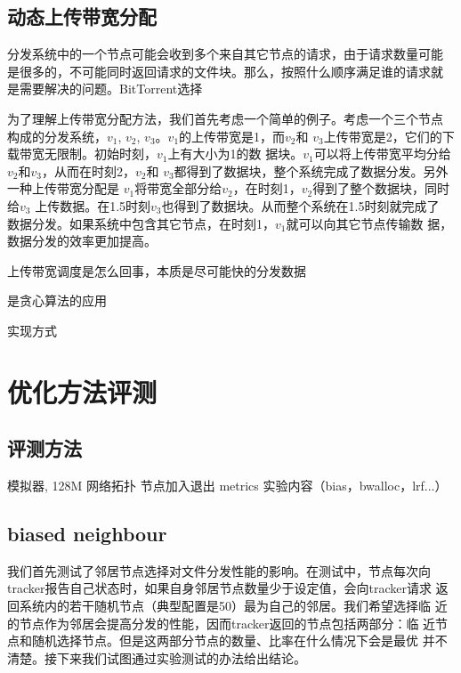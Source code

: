 \subsection{动态上传带宽分配}

分发系统中的一个节点可能会收到多个来自其它节点的请求，由于请求数量可能
是很多的，不可能同时返回请求的文件块。那么，按照什么顺序满足谁的请求就
是需要解决的问题。BitTorrent选择

为了理解上传带宽分配方法，我们首先考虑一个简单的例子。考虑一个三个节点
构成的分发系统，$v_1$, $v_2$, $v_3$。$v_1$的上传带宽是1，而$v_2$和
$v_3$上传带宽是2，它们的下载带宽无限制。初始时刻，$v_1$上有大小为1的数
据块。$v_1$可以将上传带宽平均分给$v_2$和$v_3$，从而在时刻2，$v_2$和
$v_3$都得到了数据块，整个系统完成了数据分发。另外一种上传带宽分配是
$v_1$将带宽全部分给$v_2$，在时刻1，$v_2$得到了整个数据块，同时给$v_3$
上传数据。在1.5时刻$v_3$也得到了数据块。从而整个系统在1.5时刻就完成了
数据分发。如果系统中包含其它节点，在时刻1，$v_1$就可以向其它节点传输数
据，数据分发的效率更加提高。

上传带宽调度是怎么回事，本质是尽可能快的分发数据

是贪心算法的应用

实现方式

\section{优化方法评测}

\subsection{评测方法}
模拟器, 128M
网络拓扑
节点加入退出
metrics
实验内容（bias，bwalloc，lrf...）

\subsection{biased neighbour}


我们首先测试了邻居节点选择对文件分发性能的影响。在测试中，节点每次向
tracker报告自己状态时，如果自身邻居节点数量少于设定值，会向tracker请求
返回系统内的若干随机节点（典型配置是50）最为自己的邻居。我们希望选择临
近的节点作为邻居会提高分发的性能，因而tracker返回的节点包括两部分：临
近节点和随机选择节点。但是这两部分节点的数量、比率在什么情况下会是最优
并不清楚。接下来我们试图通过实验测试的办法给出结论。

